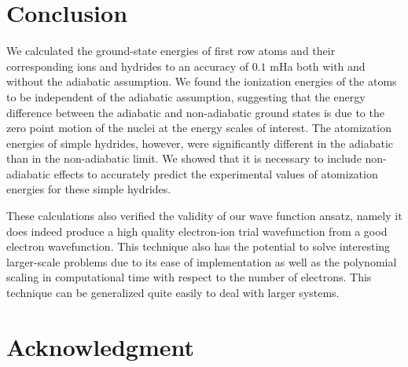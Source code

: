 \documentclass[pra,superscriptaddress,groupedaddress,twocolumn]{revtex4}
\begin{document}
\section{Conclusion}
We calculated the ground-state energies of first row atoms and their corresponding ions and hydrides to an accuracy of $0.1$ mHa both with and without the adiabatic assumption. We found the ionization energies of the atoms to be independent of the adiabatic assumption, suggesting that the energy difference between the adiabatic and non-adiabatic ground states is due to the zero point motion of the nuclei at the energy scales of interest. The atomization energies of simple hydrides, however, were significantly different in the adiabatic than in the non-adiabatic limit.   We showed that it is necessary to include non-adiabatic effects to accurately predict the experimental values of atomization energies for these simple hydrides.

These calculations also verified the validity of our wave function ansatz, namely it does indeed produce a high quality electron-ion trial wavefunction from a good electron wavefunction. This technique also has the potential to solve interesting larger-scale problems due to its ease of implementation as well as the polynomial scaling in computational time with respect to the number of electrons.  This technique can be generalized quite easily to deal with larger systems.

\section{Acknowledgment}



\end{document}

